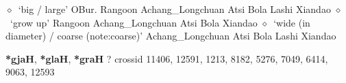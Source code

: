 \begin{list}{}{\leftmargin=1.5em \itemindent=-1.5em}
         $\diamond$~`big / large'
         OBur. 
\hspace{1ex}
         Rangoon 
\hspace{1ex}
         Achang\_Longchuan 
\hspace{1ex}
         Atsi 
\hspace{1ex}
         Bola 
\hspace{1ex}
         Lashi 
\hspace{1ex}
         Xiandao 
\hspace{1ex}
         $\diamond$~`grow up'
         Rangoon 
\hspace{1ex}
         Achang\_Longchuan 
\hspace{1ex}
         Atsi 
\hspace{1ex}
         Bola 
\hspace{1ex}
         Xiandao 
\hspace{1ex}
         $\diamond$~`wide (in diameter) / coarse (note:coarse)'
         Achang\_Longchuan 
\hspace{1ex}
         Atsi 
\hspace{1ex}
         Bola 
\hspace{1ex}
         Lashi 
\hspace{1ex}
         Xiandao 
  \end{list}
\item
\textbf{*gjaH}, \textbf{*glaH}, \textbf{*graH}
?
  {\tiny crossid 11406, 12591, 1213, 8182, 5276, 7049, 6414, 9063, 12593}

